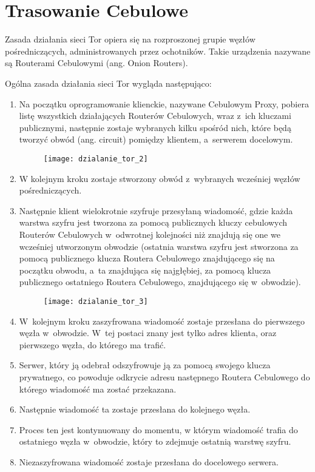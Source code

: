 \section{Trasowanie Cebulowe}

Zasada działania sieci Tor opiera się na rozproszonej grupie węzłów pośredniczących, administrowanych przez ochotników. Takie urządzenia nazywane są Routerami Cebulowymi (ang. Onion Routers). 

Ogólna zasada działania sieci Tor wygląda następująco:
\begin{enumerate}
  \begin{figure}
    \texttt{[image: dzialanie\_tor\_1]}
  \end{figure}
  \item Na początku oprogramowanie klienckie, nazywane Cebulowym Proxy, pobiera listę wszystkich działających Routerów Cebulowych, wraz z~ich kluczami publicznymi, następnie zostaje wybranych kilku spośród nich, które będą tworzyć obwód (ang. circuit) pomiędzy klientem, a~serwerem docelowym. 
  \begin{figure}
    \texttt{[image: dzialanie\_tor\_2]}
  \end{figure} 
  \item W kolejnym kroku zostaje stworzony obwód z~wybranych wcześniej węzłów pośredniczących.
  \item Następnie klient wielokrotnie szyfruje przesyłaną wiadomość, gdzie każda warstwa szyfru jest tworzona za pomocą publicznych kluczy cebulowych Routerów Cebulowych w~odwrotnej kolejności niż znajdują się one we wcześniej utworzonym obwodzie (ostatnia warstwa szyfru jest stworzona za pomocą publicznego klucza Routera Cebulowego znajdującego się na początku obwodu, a~ta znajdująca się najgłębiej, za pomocą klucza publicznego ostatniego Routera Cebulowego, znajdującego się w~obwodzie).
  \begin{figure}
    \texttt{[image: dzialanie\_tor\_3]}
  \end{figure}
  \item W~kolejnym kroku zaszyfrowana wiadomość zostaje przesłana do pierwszego węzła w~obwodzie. W~tej postaci znany jest tylko adres klienta, oraz pierwszego węzła, do którego ma trafić. 
  \item Serwer, który ją odebrał odszyfrowuje ją za pomocą swojego klucza prywatnego, co powoduje odkrycie adresu następnego Routera Cebulowego do którego wiadomość ma zostać przekazana.
  \item Następnie wiadomość ta zostaje przesłana do kolejnego węzła.
  \item Proces ten jest kontynuowany do momentu, w którym wiadomość trafia do ostatniego węzła w~obwodzie, który to zdejmuje ostatnią warstwę szyfru. \item Niezaszyfrowana wiadomość zostaje przesłana do docelowego serwera.
\end{enumerate}

